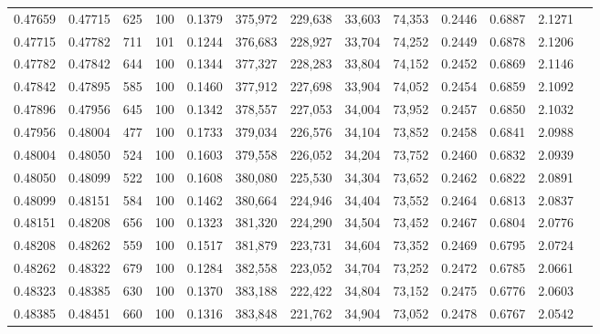 \begin{tabular}{rrrrrrrrrrrrr}
0.47659 & 0.47715 &   625 & 100 &                                     0.1379 & 375,972 & 229,638 &  33,603 &  74,353 & 0.2446 & 0.6887 & 2.1271 \\
0.47715 & 0.47782 &   711 & 101 &                                     0.1244 & 376,683 & 228,927 &  33,704 &  74,252 & 0.2449 & 0.6878 & 2.1206 \\
0.47782 & 0.47842 &   644 & 100 &                                     0.1344 & 377,327 & 228,283 &  33,804 &  74,152 & 0.2452 & 0.6869 & 2.1146 \\
0.47842 & 0.47895 &   585 & 100 &                                     0.1460 & 377,912 & 227,698 &  33,904 &  74,052 & 0.2454 & 0.6859 & 2.1092 \\
0.47896 & 0.47956 &   645 & 100 &                                     0.1342 & 378,557 & 227,053 &  34,004 &  73,952 & 0.2457 & 0.6850 & 2.1032 \\
0.47956 & 0.48004 &   477 & 100 &                                     0.1733 & 379,034 & 226,576 &  34,104 &  73,852 & 0.2458 & 0.6841 & 2.0988 \\
0.48004 & 0.48050 &   524 & 100 &                                     0.1603 & 379,558 & 226,052 &  34,204 &  73,752 & 0.2460 & 0.6832 & 2.0939 \\
0.48050 & 0.48099 &   522 & 100 &                                     0.1608 & 380,080 & 225,530 &  34,304 &  73,652 & 0.2462 & 0.6822 & 2.0891 \\
0.48099 & 0.48151 &   584 & 100 &                                     0.1462 & 380,664 & 224,946 &  34,404 &  73,552 & 0.2464 & 0.6813 & 2.0837 \\
0.48151 & 0.48208 &   656 & 100 &                                     0.1323 & 381,320 & 224,290 &  34,504 &  73,452 & 0.2467 & 0.6804 & 2.0776 \\
0.48208 & 0.48262 &   559 & 100 &                                     0.1517 & 381,879 & 223,731 &  34,604 &  73,352 & 0.2469 & 0.6795 & 2.0724 \\
0.48262 & 0.48322 &   679 & 100 &                                     0.1284 & 382,558 & 223,052 &  34,704 &  73,252 & 0.2472 & 0.6785 & 2.0661 \\
0.48323 & 0.48385 &   630 & 100 &                                     0.1370 & 383,188 & 222,422 &  34,804 &  73,152 & 0.2475 & 0.6776 & 2.0603 \\
0.48385 & 0.48451 &   660 & 100 &                                     0.1316 & 383,848 & 221,762 &  34,904 &  73,052 & 0.2478 & 0.6767 & 2.0542 \\

\end{tabular}
